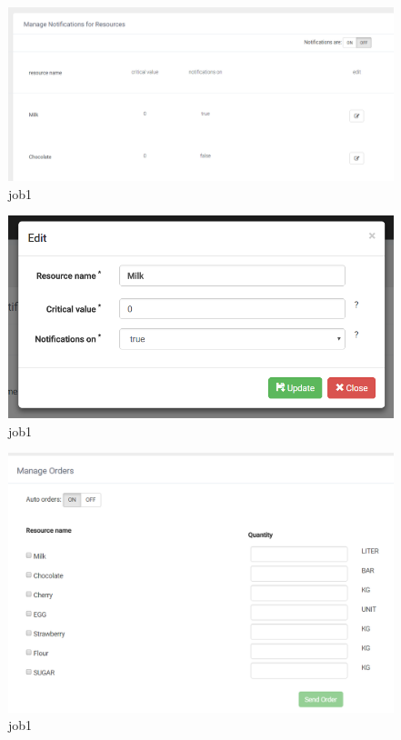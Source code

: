 \documentclass[a4paper,11pt,twoside]{report}
\theoremstyle{definition}
\begin{document}
\begin{figure}[h!]
\begin{center}
\includegraphics[width=\textwidth]{AS/notifications/1}
\end{center}
\caption{job1}
\end{figure}

\begin{figure}[h!]
\begin{center}
\includegraphics[width=\textwidth]{AS/notifications/2}
\end{center}
\caption{job1}
\end{figure}
\thispagestyle{empty}

\begin{figure}[h!]
\begin{center}
\includegraphics[width=\textwidth]{AS/orders/1}
\end{center}
\caption{job1}
\end{figure}
\thispagestyle{empty}
\end{document}
